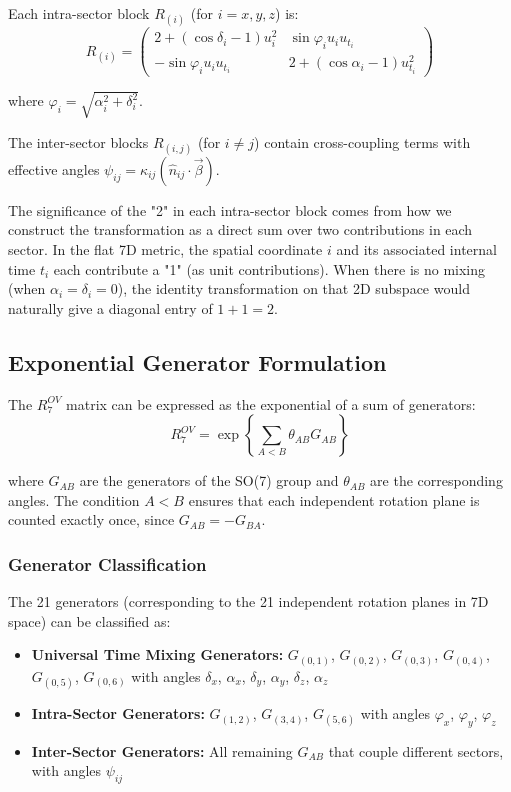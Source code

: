 \documentclass{article}
\begin{document}
Each intra-sector block $R_{(i)}$ (for $i = x, y, z$) is:
\begin{equation}
R_{(i)} = \begin{pmatrix}
2+(\cos\delta_i-1)u_i^2 & \sin\varphi_i u_i u_{t_i} \\
-\sin\varphi_i u_i u_{t_i} & 2+(\cos\alpha_i-1)u_{t_i}^2
\end{pmatrix}
\end{equation}

where $\varphi_i = \sqrt{\alpha_i^2 + \delta_i^2}$.

The inter-sector blocks $R_{(i,j)}$ (for $i \neq j$) contain cross-coupling terms with effective angles $\psi_{ij} = \kappa_{ij}(\hat{n}_{ij} \cdot \vec{\beta})$.

The significance of the "2" in each intra-sector block comes from how we construct the transformation as a direct sum over two contributions in each sector. In the flat 7D metric, the spatial coordinate $i$ and its associated internal time $t_i$ each contribute a "1" (as unit contributions). When there is no mixing (when $\alpha_i = \delta_i = 0$), the identity transformation on that 2D subspace would naturally give a diagonal entry of $1 + 1 = 2$.

\subsection{Exponential Generator Formulation}

The $R^{OV}_7$ matrix can be expressed as the exponential of a sum of generators:
\begin{equation}
R^{OV}_7 = \exp\left\{\sum_{A<B} \theta_{AB} G_{AB}\right\}
\end{equation}

where $G_{AB}$ are the generators of the SO(7) group and $\theta_{AB}$ are the corresponding angles. The condition $A < B$ ensures that each independent rotation plane is counted exactly once, since $G_{AB} = -G_{BA}$.

\subsubsection{Generator Classification}
The 21 generators (corresponding to the 21 independent rotation planes in 7D space) can be classified as:

\begin{itemize}
\item \textbf{Universal Time Mixing Generators:} $G_{(0,1)}$, $G_{(0,2)}$, $G_{(0,3)}$, $G_{(0,4)}$, $G_{(0,5)}$, $G_{(0,6)}$ with angles $\delta_x$, $\alpha_x$, $\delta_y$, $\alpha_y$, $\delta_z$, $\alpha_z$

\item \textbf{Intra-Sector Generators:} $G_{(1,2)}$, $G_{(3,4)}$, $G_{(5,6)}$ with angles $\varphi_x$, $\varphi_y$, $\varphi_z$

\item \textbf{Inter-Sector Generators:} All remaining $G_{AB}$ that couple different sectors, with angles $\psi_{ij}$
\end{itemize}
\end{document}
